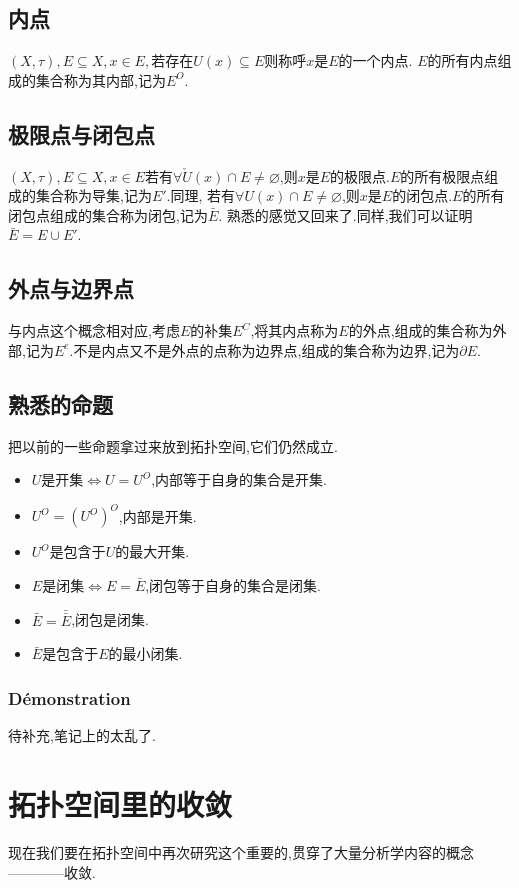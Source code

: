 \documentclass[12pt, a4paper, oneside]{ctexbook}
\begin{document}
  \subsection{内点}
  $(X,\tau), E\subseteq X,x\in E,\text{若存在} U(x)\subseteq E$则称呼$x$是$E$的一个内点. $E$的所有内点组成的集合称为其内部,记为$E^O$.
  \subsection{极限点与闭包点}
  $(X,\tau), E\subseteq X,x\in E$若有$\forall\check{U}(x)\cap E\neq\varnothing$,则$x$是$E$的极限点.$E$的所有极限点组成的集合称为导集,记为$E'$.同理,
  若有$\forall U(x)\cap E\neq\varnothing$,则$x$是$E$的闭包点.$E$的所有闭包点组成的集合称为闭包,记为$\bar{E}$.
  熟悉的感觉又回来了.同样,我们可以证明$\bar{E}=E\cup E'$.
  \subsection{外点与边界点}
  与内点这个概念相对应,考虑$E$的补集$E^C$,将其内点称为$E$的外点,组成的集合称为外部,记为$E^e$.不是内点又不是外点的点称为边界点,组成的集合称为边界,记为$\partial E$.
  \subsection{熟悉的命题}
  把以前的一些命题拿过来放到拓扑空间,它们仍然成立.
  \begin{itemize}
    \item $U\text{是开集}\Leftrightarrow U=U^O$,内部等于自身的集合是开集.
    \item $U^O=(U^O)^O$,内部是开集.
    \item $U^O$是包含于$U$的最大开集.
    \item $E\text{是闭集}\Leftrightarrow E=\bar{E}$,闭包等于自身的集合是闭集.
    \item $\bar{E}=\bar{\bar{E}}$,闭包是闭集.
    \item $\bar{E}$是包含于$E$的最小闭集.
  \end{itemize}
  \subsubsection{Démonstration}
  待补充,笔记上的太乱了.




\section{拓扑空间里的收敛 }
  现在我们要在拓扑空间中再次研究这个重要的,贯穿了大量分析学内容的概念————收敛.
\end{document}
